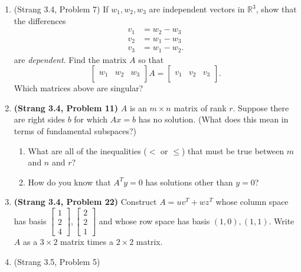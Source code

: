 \documentclass[11pt]{article}
\newcommand{\rr}{\mathbb{R}}
\begin{document}
\begin{enumerate}


\item (Strang 3.4, Problem 7) If $w_1, w_2, w_3$ are independent vectors in $\rr^3$, show that the differences 
\begin{align*}
v_1 &= w_2 - w_3 \\
v_2 &= w_1 - w_3 \\
v_3 &= w_1 - w_2.
\end{align*}
are \emph{dependent}.  Find the matrix $A$ so that
\[ \begin{bmatrix} \\ w_1 & w_2 & w_3 \\ &\end{bmatrix}A = \begin{bmatrix} \\ v_1 & v_2 & v_3 \\ &\end{bmatrix}.\]
Which matrices above are singular?

\item \textbf{(Strang 3.4, Problem 11)} $A$ is an $m \times n$ matrix of rank $r$.  Suppose there are right sides $b$ for which $Ax = b$ has no solution.  (What does this mean in terms of fundamental subspaces?)


\begin{enumerate}

\item What are all of the inequalities ($<$ or $\leq$) that must be true between $m$ and $n$ and $r$?

\item How do you know that $A^Ty=0$ has solutions other than $y=0$?


\end{enumerate}

\item \textbf{(Strang 3.4, Problem 22)} Construct $A = uv^T + wz^T$ whose column space has basis $\begin{bmatrix} 1 \\ 2 \\ 4 \end{bmatrix}, \begin{bmatrix} 2 \\ 2 \\ 1 \end{bmatrix}$ and whose row space has basis $(1,0), (1,1)$.  Write $A$ as a $3 \times 2$ matrix times a $2 \times 2$ matrix.

\item (Strang 3.5, Problem 5) 
\begin{enumerate}


\end{enumerate}
\end{enumerate}
\end{document}

